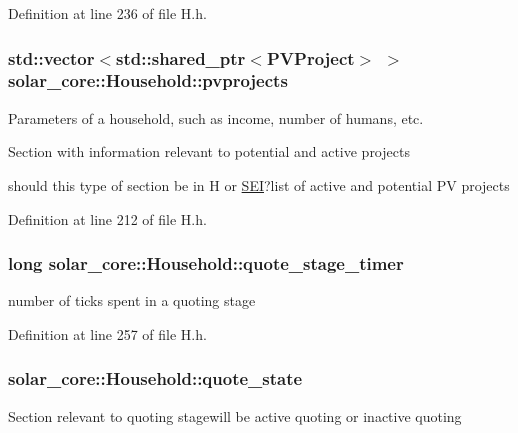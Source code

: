 Definition at line 236 of file H.\+h.

\hypertarget{classsolar__core_1_1_household_a79c0e955af98669487e0fb472811f842}{}
\subsubsection[{pvprojects}]{\setlength{\rightskip}{0pt plus 5cm}std\+::vector$<$std\+::shared\+\_\+ptr$<${\bf P\+V\+Project}$>$ $>$ solar\+\_\+core\+::\+Household\+::pvprojects\hspace{0.3cm}{\ttfamily [protected]}}\label{classsolar__core_1_1_household_a79c0e955af98669487e0fb472811f842}
Parameters of a household, such as income, number of humans, etc. \begin{DoxyVerb} Section with information relevant to potential and active projects
\end{DoxyVerb}
 should this type of section be in H or \hyperlink{classsolar__core_1_1_s_e_i}{S\+E\+I}?list of active and potential P\+V projects 

Definition at line 212 of file H.\+h.

\hypertarget{classsolar__core_1_1_household_a6b35426fd691daa6d352ec34a6ec6e4d}{}
\subsubsection[{quote\+\_\+stage\+\_\+timer}]{\setlength{\rightskip}{0pt plus 5cm}long solar\+\_\+core\+::\+Household\+::quote\+\_\+stage\+\_\+timer\hspace{0.3cm}{\ttfamily [protected]}}\label{classsolar__core_1_1_household_a6b35426fd691daa6d352ec34a6ec6e4d}
number of ticks spent in a quoting stage 

Definition at line 257 of file H.\+h.

\hypertarget{classsolar__core_1_1_household_a4ae618de9a28895317824b185b57ab24}{}
\subsubsection[{quote\+\_\+state}]{ solar\+\_\+core\+::\+Household\+::quote\+\_\+state\hspace{0.3cm}{\ttfamily [protected]}}\label{classsolar__core_1_1_household_a4ae618de9a28895317824b185b57ab24}
Section relevant to quoting stagewill be active quoting or inactive quoting 


